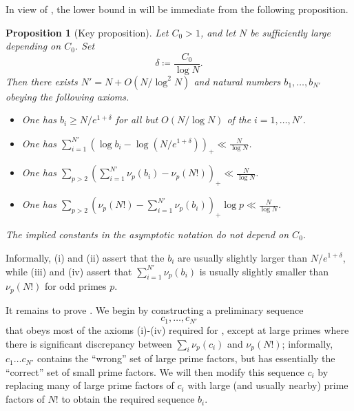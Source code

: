 \documentclass[12pt,a4paper,reqno]{amsart}
\numberwithin{equation}{section}
\theoremstyle{plain}
\newtheorem{proposition}[theorem]{Proposition}
\theoremstyle{definition}
\begin{document}
In view of , the lower bound in  will be immediate from the following proposition.

\begin{proposition}[Key proposition]\label{key-prop}  Let $C_0 > 1$, and let $N$ be sufficiently large depending on $C_0$.  Set
  \begin{equation}\label{delta-def}
    \delta \coloneqq \frac{C_0}{\log N}.
  \end{equation}
Then there exists $N' = N + O(N/\log^2 N)$ and natural numbers $b_1,\dots,b_{N'}$ obeying the following axioms.
\begin{itemize}
\item[(i)] One has $b_i  \geq N/e^{1+\delta}$ for all but $O(N/\log N)$ of the $i=1,\dots,N'$.
\item[(ii)] One has
$\sum_{i=1}^{N'} (\log b_i - \log (N/e^{1+\delta}))_+ \ll \frac{N}{\log N}$.
\item[(iii)] One has
 $\sum_{p>2} (\sum_{i=1}^{N'} \nu_p(b_i) - \nu_p(N!))_+ \ll \frac{N}{\log N}$.
\item[(iv)] One has
 $\sum_{p>2} (\nu_p(N!) - \sum_{i=1}^{N'} \nu_p(b_i))_+ \log p \ll \frac{N}{\log N}$.
\end{itemize}
The implied constants in the asymptotic notation do not depend on $C_0$.
\end{proposition}

Informally, (i) and (ii) assert that the $b_i$ are usually slightly larger than $N/e^{1+\delta}$, while (iii) and (iv) assert that $\sum_{i=1}^{N'} \nu_p(b_i)$ is usually slightly smaller than $\nu_p(N!)$ for odd primes $p$.

It remains to prove .  We begin by constructing a preliminary sequence
$$c_1,\dots,c_{N'}$$
that obeys most of the axioms (i)-(iv) required for , except at large primes where there is significant discrepancy between $\sum_i \nu_p(c_i)$ and $\nu_p(N!)$; informally, $c_1 \dots c_{N'}$ contains the ``wrong'' set of large prime factors, but has essentially the ``correct'' set of small prime factors.  We will then modify this sequence $c_i$ by replacing many of large prime factors of $c_i$ with large (and usually nearby) prime factors of $N!$ to obtain the required sequence $b_i$.
\end{document}
